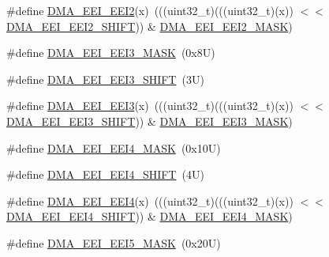 \begin{DoxyCompactItemize}
\#define \mbox{\hyperlink{group___d_m_a___register___masks_gac81f32d98412b6586c24853736f29113}{D\+M\+A\+\_\+\+E\+E\+I\+\_\+\+E\+E\+I2}}(x)~(((uint32\+\_\+t)(((uint32\+\_\+t)(x)) $<$$<$ \mbox{\hyperlink{group___d_m_a___register___masks_ga1455b4521842d7f51307bd79c2524b4e}{D\+M\+A\+\_\+\+E\+E\+I\+\_\+\+E\+E\+I2\+\_\+\+S\+H\+I\+FT}})) \& \mbox{\hyperlink{group___d_m_a___register___masks_ga24c1e04e6f4916148ed252a53df2055f}{D\+M\+A\+\_\+\+E\+E\+I\+\_\+\+E\+E\+I2\+\_\+\+M\+A\+SK}})
\item 
\#define \mbox{\hyperlink{group___d_m_a___register___masks_gac4a71957c4a8f61de07af20b2ec2026b}{D\+M\+A\+\_\+\+E\+E\+I\+\_\+\+E\+E\+I3\+\_\+\+M\+A\+SK}}~(0x8\+U)
\item 
\#define \mbox{\hyperlink{group___d_m_a___register___masks_gaf042de0f122739453b8685fd3ccdef61}{D\+M\+A\+\_\+\+E\+E\+I\+\_\+\+E\+E\+I3\+\_\+\+S\+H\+I\+FT}}~(3\+U)
\item 
\#define \mbox{\hyperlink{group___d_m_a___register___masks_ga5ecf52c202df2dc5819ee1ddaa19c5b2}{D\+M\+A\+\_\+\+E\+E\+I\+\_\+\+E\+E\+I3}}(x)~(((uint32\+\_\+t)(((uint32\+\_\+t)(x)) $<$$<$ \mbox{\hyperlink{group___d_m_a___register___masks_gaf042de0f122739453b8685fd3ccdef61}{D\+M\+A\+\_\+\+E\+E\+I\+\_\+\+E\+E\+I3\+\_\+\+S\+H\+I\+FT}})) \& \mbox{\hyperlink{group___d_m_a___register___masks_gac4a71957c4a8f61de07af20b2ec2026b}{D\+M\+A\+\_\+\+E\+E\+I\+\_\+\+E\+E\+I3\+\_\+\+M\+A\+SK}})
\item 
\#define \mbox{\hyperlink{group___d_m_a___register___masks_ga82cc585c2bd012b4339e34f3c5197b2d}{D\+M\+A\+\_\+\+E\+E\+I\+\_\+\+E\+E\+I4\+\_\+\+M\+A\+SK}}~(0x10\+U)
\item 
\#define \mbox{\hyperlink{group___d_m_a___register___masks_gaab5ae9bdb1a215ec5c884b880e746542}{D\+M\+A\+\_\+\+E\+E\+I\+\_\+\+E\+E\+I4\+\_\+\+S\+H\+I\+FT}}~(4\+U)
\item 
\#define \mbox{\hyperlink{group___d_m_a___register___masks_ga06773cb95c708e69120a1f3e3f7d2d52}{D\+M\+A\+\_\+\+E\+E\+I\+\_\+\+E\+E\+I4}}(x)~(((uint32\+\_\+t)(((uint32\+\_\+t)(x)) $<$$<$ \mbox{\hyperlink{group___d_m_a___register___masks_gaab5ae9bdb1a215ec5c884b880e746542}{D\+M\+A\+\_\+\+E\+E\+I\+\_\+\+E\+E\+I4\+\_\+\+S\+H\+I\+FT}})) \& \mbox{\hyperlink{group___d_m_a___register___masks_ga82cc585c2bd012b4339e34f3c5197b2d}{D\+M\+A\+\_\+\+E\+E\+I\+\_\+\+E\+E\+I4\+\_\+\+M\+A\+SK}})
\item 
\#define \mbox{\hyperlink{group___d_m_a___register___masks_gaa4b78d7eb6113d5715dd1b005370254b}{D\+M\+A\+\_\+\+E\+E\+I\+\_\+\+E\+E\+I5\+\_\+\+M\+A\+SK}}~(0x20\+U)
\item 
$$
\end{DoxyCompactItemize}
